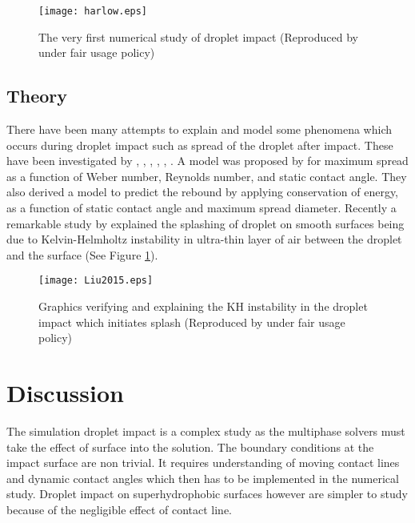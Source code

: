 \begin{figure}[tbp]
\centering
 \texttt{[image: harlow.eps]}
 \caption[First numerical study on droplet impact]{The very first numerical study of droplet 
 impact (Reproduced by \cite{Harlow1967} under fair usage policy)}
\end{figure}

\subsection{Theory}
There have been many attempts to explain and model some phenomena which occurs during droplet impact such as 
spread of the droplet after impact. These have been investigated by \cite{Madejski1976}, \cite{Jones1971}, \cite{Chandra1991}, \cite{Scheller1995}, \cite{Bennett1993}, \cite{Pasandideh1996}.
A model was proposed by \cite{Mao1997} for maximum spread as a function of 
 Weber number, Reynolds number, and static contact angle. They also derived a model to predict the rebound by applying conservation of energy, as a function of 
 static contact angle and maximum spread diameter.
Recently a remarkable study by \cite {Liu2015} explained the splashing of droplet on smooth surfaces being due to Kelvin-Helmholtz instability in ultra-thin layer of 
air between the droplet and the surface (See Figure \ref{Fig:liu}).
\begin{figure}
 \centering
 \texttt{[image: Liu2015.eps]}
 \caption[Kelvin-Helmholtz instability in a droplet splash]{Graphics verifying and explaining the KH instability in the droplet impact which initiates splash (Reproduced by \cite{Liu2015} under fair usage policy)}
 \label{Fig:liu}
\end{figure}

\section{Discussion}
The simulation droplet impact is a complex study as the multiphase solvers must take the effect of surface into the solution. The boundary conditions at the impact surface are non trivial. It
requires understanding of moving contact lines and dynamic contact angles which then has to be implemented in the numerical study. Droplet impact on superhydrophobic surfaces 
however are simpler to study because of the negligible effect of contact line.

